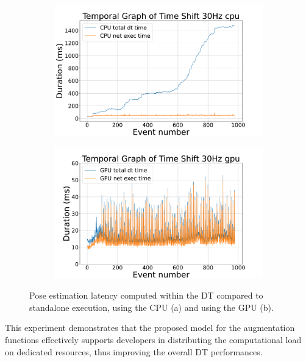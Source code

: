 \begin{figure}
    \centering
    \begin{subfigure}{0.49\textwidth}
    \centering
        \includegraphics[width=\textwidth]{figures/temporal_graph_time_shift_30hz_cpu.pdf}
        \subcaption{}
        \label{fig:af_time_shift_30hz_cpu}
    \end{subfigure}
    \hfill
    \begin{subfigure}{0.49\textwidth}
    \centering
        \includegraphics[width=\textwidth]{figures/temporal_graph_time_shift_30hz_gpu.pdf}
        \subcaption{}
        \label{fig:af_time_shift_30hz_gpu}
    \end{subfigure}
    \caption{Pose estimation latency computed within the DT compared to standalone execution, using the CPU (a) and using the GPU (b).}
    \label{fig:af_results}
\end{figure}

This experiment demonstrates that the proposed model for the augmentation functions effectively supports developers in distributing the computational load on dedicated resources, thus improving the overall \ac{DT} performances. 

